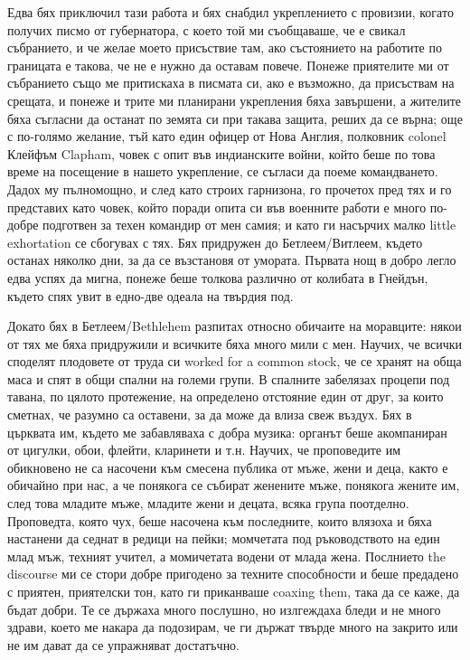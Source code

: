 \documentclass[12pt]{book}
\begin{document}
Едва бях приключил тази работа и бях снабдил укреплението с провизии, когато получих писмо от губернатора, с което той ми съобщаваше, че е свикал събранието, и че желае моето присъствие там, ако състоянието на работите по границата е такова, че не е нужно да оставам повече. Понеже приятелите ми от събранието също ме притискаха в писмата си, ако е възможно, да присъствам на срещата, и понеже и трите ми планирани укрепления бяха завършени, а жителите бяха съгласни да останат по земята си при такава защита, реших да се върна; още с по-голямо желание, тъй като един офицер от Нова Англия, полковник colonel Клейфъм Clapham, човек с опит във индианските войни, който беше по това време на посещение в нашето укрепление, се съгласи да поеме командването. Дадох му пълномощно, и след като строих гарнизона, го прочетох пред тях и го представих като човек, който поради опита си във военните работи е много по-добре подготвен за техен командир от мен самия; и като ги насърчих малко little exhortation се сбогувах с тях. Бях придружен до Бетлеем/Витлеем, където останах няколко дни, за да се възстановя от умората. Първата нощ в добро легло едва успях да мигна, понеже беше толкова различно от колибата в Гнейдън, където спях увит в едно-две одеала на твърдия под.

Докато бях в Бетлеем/Bethlehem разпитах относно обичаите на моравците: някои от тях ме бяха придружили и всичките бяха много мили с мен. Научих, че всички споделят плодовете от труда си worked for a common stock, че се хранят на обща маса и спят в общи спални на големи групи. В спалните забелязах процепи под тавана, по цялото протежение, на определено отстояние един от друг, за които сметнах, че разумно са оставени, за да може да влиза свеж въздух. Бях в църквата им, където ме забавляваха с добра музика: органът беше акомпаниран от цигулки, обои, флейти, кларинети и т.н. Научих, че проповедите им обикновено не са насочени към смесена публика от мъже, жени и деца, както е обичайно при нас, а че понякога се събират женените мъже, понякога жените им, след това младите мъже, младите жени и децата, всяка група поотделно. Проповедта, която чух, беше насочена към последните, които влязоха и бяха настанени да седнат в редици на пейки; момчетата под ръководството на един млад мъж, техният учител, а момичетата водени от млада жена. Послнието the discourse ми се стори добре пригодено за техните способности и беше предадено с приятен, приятелски тон, като ги приканваше coaxing them, така да се каже, да бъдат добри. Те се държаха много послушно, но излгеждаха бледи и не много здрави, което ме накара да подозирам, че ги държат твърде много на закрито или не им дават да се упражняват достатъчно.
\end{document}
